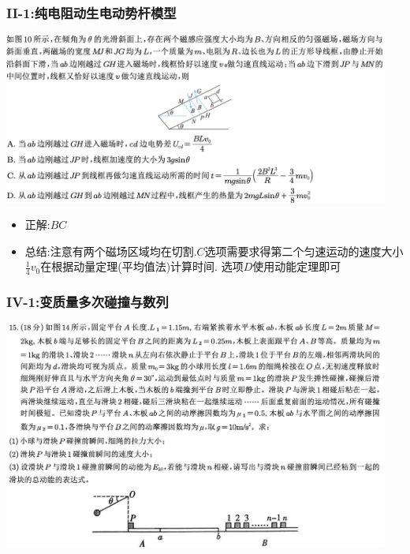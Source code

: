 \documentclass{article}
\begin{document}
\vspace{2em}

\subsubsection{II-1:纯电阻动生电动势杆模型}
\includegraphics[width=0.95\textwidth,keepaspectratio]{./pictures/3.2-3.png}

\begin{itemize}
    \item 正解:\quad $BC$
    \item 总结:\quad 注意有两个磁场区域均在切割.$C$选项需要求得第二个匀速运动的速度大小$\frac{1}{4}v_{0}$在根据动量定理(平均值法)计算时间.
          选项$D$使用动能定理即可
\end{itemize}

\vspace{2em}

\subsubsection{IV-1:变质量多次碰撞与数列}
\includegraphics[width=0.95\textwidth,keepaspectratio]{./pictures/3.2-4.png}
\end{document}
